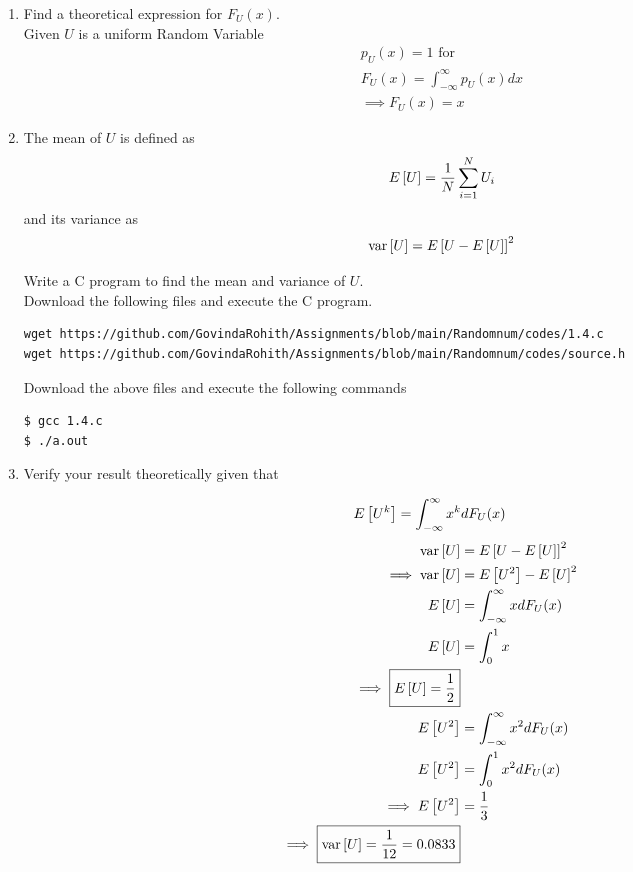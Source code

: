 \documentclass[journal,12pt,twocolumn]{IEEEtran}
\begin{document}
\begin{enumerate}[label=\thesection.\arabic*
,ref=\thesection.\theenumi]
%
\item
Find a  theoretical expression for $F_{U}(x)$.\\
\solution Given $U$ is a uniform Random Variable
\begin{align}
p_{U}(x)=1 \text{ for } \\
F_U(x)=\int_{-\infty}^{\infty}p_{U}(x)dx\\
\implies {F_U(x)=x  }
\end{align}
\item
The mean of $U$ is defined as
%
\begin{equation}
E{}\left[U\right] = \frac{1}{N}\sum_{i=1}^{N}U_i
\end{equation}
%
and its variance as
%
\begin{equation}
\text{var}{}\left[U\right] = E{}\left[U- E{}\left[U\right]\right]^2 
\end{equation}

Write a C program to  find the mean and variance of $U$. \\
\solution Download the following files and execute the  C program.
\begin{lstlisting}
wget https://github.com/GovindaRohith/Assignments/blob/main/Randomnum/codes/1.4.c
wget https://github.com/GovindaRohith/Assignments/blob/main/Randomnum/codes/source.h
\end{lstlisting}
Download the above files and execute the following commands
\begin{lstlisting}
$ gcc 1.4.c
$ ./a.out
\end{lstlisting}
\item Verify your result theoretically given that
\end{enumerate}
%
\begin{equation}
E{}\left[U^k\right] = \int_{-\infty}^{\infty}x^kdF_{U}(x)
\end{equation}
\solution 
\begin{align}
    \text{var}{}\left[U\right] &= E{}\left[U- E{}\left[U\right]\right]^2\\ 
    \implies \text{var}{}\left[U\right] &= E{}\left[U^2\right]- E{}\left[U\right]^2 \\
    E{}\left[U\right]&=\int_{-\infty}^{\infty}xdF_U(x)\\
    E{}\left[U\right]&=\int_{0}^{1}x\\
    \implies \boxed{E{}\left[U\right]=\frac{1}{2}}\\
    E{}\left[U^2\right]&=\int_{-\infty}^{\infty}x^{2}dF_U(x)\\
    E{}\left[U^2\right]&=\int_{0}^{1}x^{2}dF_U(x)\\
    \implies E{}\left[U^2\right]&=\frac{1}{3}\\
    \implies \boxed{\text{var}{}\left[U\right]=\frac{1}{12}=0.0833}
\end{align}
\end{document}
